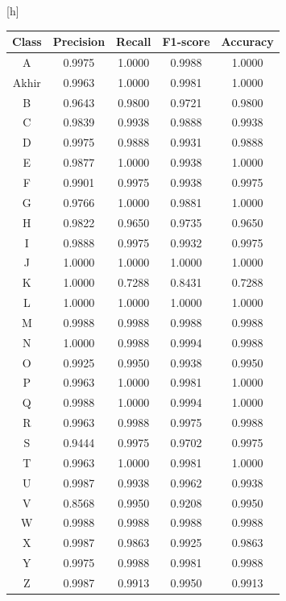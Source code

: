 \begin{center}[h]
	\begin{table}[htbp]
	\centering
	\label{tbl:ModelCNN2CONFUSIONMATRIX}
	\begin{tabular}{|c|c|c|c|c|}
	\hline
	Class & Precision & Recall & F1-score & Accuracy \\
	\hline
	A & 0.9975 & 1.0000 & 0.9988 & 1.0000 \\
	Akhir & 0.9963 & 1.0000 & 0.9981 & 1.0000 \\
	B & 0.9643 & 0.9800 & 0.9721 & 0.9800 \\
	C & 0.9839 & 0.9938 & 0.9888 & 0.9938 \\
	D & 0.9975 & 0.9888 & 0.9931 & 0.9888 \\
	E & 0.9877 & 1.0000 & 0.9938 & 1.0000 \\
	F & 0.9901 & 0.9975 & 0.9938 & 0.9975 \\
	G & 0.9766 & 1.0000 & 0.9881 & 1.0000 \\
	H & 0.9822 & 0.9650 & 0.9735 & 0.9650 \\
	I & 0.9888 & 0.9975 & 0.9932 & 0.9975 \\
	J & 1.0000 & 1.0000 & 1.0000 & 1.0000 \\
	K & 1.0000 & 0.7288 & 0.8431 & 0.7288 \\
	L & 1.0000 & 1.0000 & 1.0000 & 1.0000 \\
	M & 0.9988 & 0.9988 & 0.9988 & 0.9988 \\
	N & 1.0000 & 0.9988 & 0.9994 & 0.9988 \\
	O & 0.9925 & 0.9950 & 0.9938 & 0.9950 \\
	P & 0.9963 & 1.0000 & 0.9981 & 1.0000 \\
	Q & 0.9988 & 1.0000 & 0.9994 & 1.0000 \\
	R & 0.9963 & 0.9988 & 0.9975 & 0.9988 \\
	S & 0.9444 & 0.9975 & 0.9702 & 0.9975 \\
	T & 0.9963 & 1.0000 & 0.9981 & 1.0000 \\
	U & 0.9987 & 0.9938 & 0.9962 & 0.9938 \\
	V & 0.8568 & 0.9950 & 0.9208 & 0.9950 \\
	W & 0.9988 & 0.9988 & 0.9988 & 0.9988 \\
	X & 0.9987 & 0.9863 & 0.9925 & 0.9863 \\
	Y & 0.9975 & 0.9988 & 0.9981 & 0.9988 \\
	Z & 0.9987 & 0.9913 & 0.9950 & 0.9913 \\
	\hline
	\end{tabular}
	\end{table}
\end{center}


